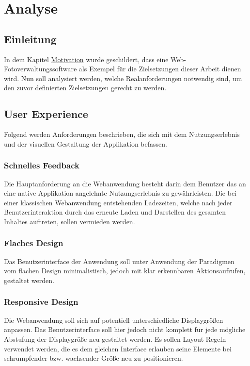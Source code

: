 \chapter{Analyse}
\label{sec:analysis}

\section{Einleitung}

In dem Kapitel \hyperref[sec:motivation]{Motivation} wurde geschildert, dass eine Web-Fotoverwaltungssoftware als Exempel für die Zielsetzungen dieser Arbeit dienen wird. Nun soll analysiert werden, welche Realanforderungen notwendig sind, um den zuvor definierten \hyperref[sec:zielsetzung]{Zielsetzungen} gerecht zu werden.

\section{User Experience}

Folgend werden Anforderungen beschrieben, die sich mit dem Nutzungserlebnis und der visuellen Gestaltung der Applikation befassen.

\subsection{Schnelles Feedback}

Die Hauptanforderung an die Webanwendung besteht darin dem Benutzer das an eine native Applikation angelehnte Nutzungserlebnis zu gewährleisten. Die bei einer
klassischen Webanwendung entstehenden Ladezeiten, welche nach jeder Benutzerinteraktion durch das erneute Laden und Darstellen des gesamten Inhaltes
auftreten, sollen vermieden werden.

\subsection{Flaches Design}

Das Benutzerinterface der Anwendung soll unter Anwendung der Paradigmen vom flachen Design minimalistisch, jedoch mit klar erkennbaren Aktionsaufrufen, gestaltet werden.

\subsection{Responsive Design}

Die Webanwendung soll sich auf potentiell unterschiedliche Displaygrößen anpassen. Das Benutzerinterface soll hier jedoch nicht komplett für jede mögliche Abstufung der Displaygröße neu gestaltet werden. Es sollen Layout Regeln verwendet werden, die es dem gleichen Interface erlauben seine Elemente bei schrumpfender bzw. wachsender Größe neu zu positionieren.

